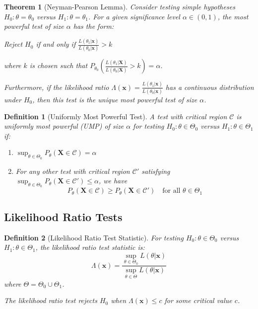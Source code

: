 \documentclass[12pt,a4paper]{article}
\newtheorem{theorem}{Theorem}[section]
\newtheorem{definition}{Definition}[section]
\theoremstyle{remark}
\begin{document}
\begin{theorem}[Neyman-Pearson Lemma]
Consider testing simple hypotheses $H_0: \theta = \theta_0$ versus $H_1: \theta = \theta_1$. For a given significance level $\alpha \in (0,1)$, the most powerful test of size $\alpha$ has the form:

Reject $H_0$ if and only if $\frac{L(\theta_1|\mathbf{x})}{L(\theta_0|\mathbf{x})} > k$

where $k$ is chosen such that $P_{\theta_0}\left(\frac{L(\theta_1|\mathbf{X})}{L(\theta_0|\mathbf{X})} > k\right) = \alpha$.

Furthermore, if the likelihood ratio $\Lambda(\mathbf{x}) = \frac{L(\theta_1|\mathbf{x})}{L(\theta_0|\mathbf{x})}$ has a continuous distribution under $H_0$, then this test is the unique most powerful test of size $\alpha$.
\end{theorem}

\begin{definition}[Uniformly Most Powerful Test]
A test with critical region $\mathcal{C}$ is uniformly most powerful (UMP) of size $\alpha$ for testing $H_0: \theta \in \Theta_0$ versus $H_1: \theta \in \Theta_1$ if:
\begin{enumerate}
\item $\sup_{\theta \in \Theta_0} P_\theta(\mathbf{X} \in \mathcal{C}) = \alpha$
\item For any other test with critical region $\mathcal{C}'$ satisfying $\sup_{\theta \in \Theta_0} P_\theta(\mathbf{X} \in \mathcal{C}') \leq \alpha$, we have
$$P_\theta(\mathbf{X} \in \mathcal{C}) \geq P_\theta(\mathbf{X} \in \mathcal{C}') \quad \text{for all } \theta \in \Theta_1$$
\end{enumerate}
\end{definition}

\subsection{Likelihood Ratio Tests}

\begin{definition}[Likelihood Ratio Test Statistic]
For testing $H_0: \theta \in \Theta_0$ versus $H_1: \theta \in \Theta_1$, the likelihood ratio test statistic is:
$$\Lambda(\mathbf{x}) = \frac{\sup_{\theta \in \Theta_0} L(\theta|\mathbf{x})}{\sup_{\theta \in \Theta} L(\theta|\mathbf{x})}$$
where $\Theta = \Theta_0 \cup \Theta_1$.

The likelihood ratio test rejects $H_0$ when $\Lambda(\mathbf{x}) \leq c$ for some critical value $c$.
\end{definition}
\end{document}
